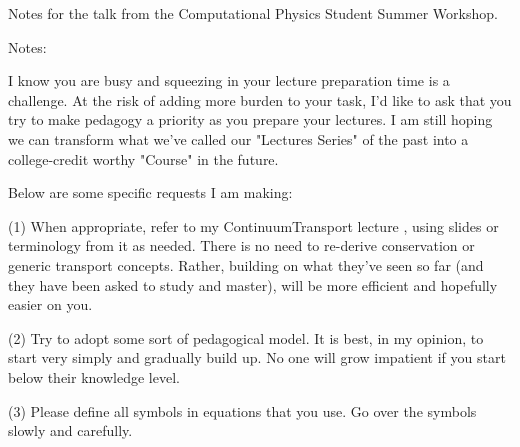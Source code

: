 Notes for the talk from the Computational Physics Student Summer Workshop. 


Notes: 

I know you are busy and squeezing in your lecture preparation time is a
challenge.  At the risk of adding more burden to your task, I'd like to
ask that you try to make pedagogy a priority as you prepare your
lectures.  I am still hoping we can transform what we've called our
"Lectures Series" of the past into a college-credit worthy "Course" in
the future.    
 
Below are some specific requests I am making:
 
(1) When appropriate, refer to my ContinuumTransport lecture , using
slides or terminology from it as needed.  There is no need to re-derive
conservation or generic transport concepts.  Rather, building on what
they've seen so far (and they have been asked to study and master), will
be more efficient and hopefully easier on you. 
 
(2) Try to adopt some sort of pedagogical model.  It is best, in my
opinion, to start very simply and gradually build up.  No one will grow
impatient if you start below their knowledge level. 
 
(3) Please define all symbols in equations that you use.  Go over the
symbols slowly and carefully. 